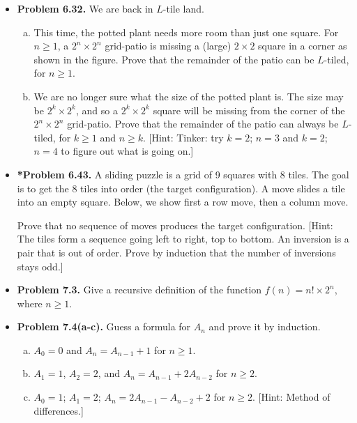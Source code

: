 \documentclass[11pt]{article}
\begin{document}
\begin{itemize}
\vspace{0.1in}

\item \textbf{Problem 6.32.}
  We are back in $L$-tile land.
  \begin{enumerate}[(a)]
  \item This time, the potted plant needs more room than just one square.
    For $n\ge 1$, a $2^n\times 2^n$ grid-patio is missing a (large) $2\times 2$ square
    in a corner as shown in the figure.
    Prove that the remainder of the patio can be $L$-tiled, for $n\ge 1$.
  \item We are no longer sure what the size of the potted plant is.
    The size may be $2^k\times 2^k$, and so a $2^k\times 2^k$ square
    will be missing from the corner of the $2^n\times 2^n$ grid-patio.
    Prove that the remainder of the patio can always be $L$-tiled,
    for $k\ge 1$ and $n\ge k$.
    [Hint: Tinker: try $k=2$; $n=3$ and $k=2$; $n=4$ to figure out what is going on.]
  \end{enumerate}

\newpage

\item \textbf{*Problem 6.43.}
  A sliding puzzle is a grid of 9 squares with 8 tiles.
  The goal is to get the 8 tiles into order (the target configuration).
  A move slides a tile into an empty square.
  Below, we show first a row move, then a column move.

  Prove that no sequence of moves produces the target configuration.
  [Hint: The tiles form a sequence going left to right, top to bottom.
  An inversion is a pair that is out of order.
  Prove by induction that the number of inversions stays odd.]

\vspace{0.1in}

\item \textbf{Problem 7.3.}
  Give a recursive definition of the function $f(n)=n!\times 2^n$, where $n\ge 1$.

\vspace{0.1in}

\item \textbf{Problem 7.4(a-c).}
  Guess a formula for $A_n$ and prove it by induction.
  \begin{enumerate}[(a)]
  \item $A_0=0$ and $A_n=A_{n-1}+1$ for $n\ge 1$.
  \item $A_1=1$, $A_2=2$, and $A_n=A_{n-1}+2A_{n-2}$ for $n\ge 2$.
  \item $A_0=1$; $A_1=2$; $A_n=2A_{n-1}-A_{n-2}+2$ for $n\ge 2$.
    [Hint: Method of differences.]
  \end{enumerate}

\end{itemize}
\end{document}
